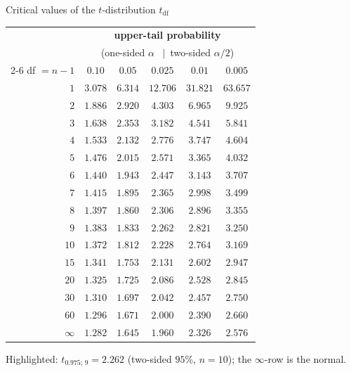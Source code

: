 \documentclass[aspectratio=169,11pt]{beamer}
\begin{document}
\begin{frame}{Critical values of the $t$-distribution $t_{\mathrm{df}}$}
  \begin{center}
    \scriptsize
    \renewcommand{\arraystretch}{0.95}
    \begin{tabular}{r|ccccc}
      \toprule
      & \multicolumn{5}{c}{\textbf{upper-tail probability}}\\
      & \multicolumn{5}{c}{(one-sided $\alpha$ \ $\mid$\ two-sided $\alpha/2$)}\\
      \cmidrule(l){2-6}
      df $=n-1$ & $0.10$ & $0.05$ & $0.025$ & $0.01$ & $0.005$\\
      \midrule
      $1$   & $3.078$ & $6.314$ & $12.706$ & $31.821$ & $63.657$\\
      $2$   & $1.886$ & $2.920$ & $4.303$  & $6.965$  & $9.925$\\
      $3$   & $1.638$ & $2.353$ & $3.182$  & $4.541$  & $5.841$\\
      $4$   & $1.533$ & $2.132$ & $2.776$  & $3.747$  & $4.604$\\
      $5$   & $1.476$ & $2.015$ & $2.571$  & $3.365$  & $4.032$\\
      $6$   & $1.440$ & $1.943$ & $2.447$  & $3.143$  & $3.707$\\
      $7$   & $1.415$ & $1.895$ & $2.365$  & $2.998$  & $3.499$\\
      $8$   & $1.397$ & $1.860$ & $2.306$  & $2.896$  & $3.355$\\
      $9$   & $1.383$ & $1.833$ & \cellcolor{hsbiorange!35}$2.262$ & $2.821$ & $3.250$\\
      $10$  & $1.372$ & $1.812$ & $2.228$  & $2.764$  & $3.169$\\
      $15$  & $1.341$ & $1.753$ & $2.131$  & $2.602$  & $2.947$\\
      $20$  & $1.325$ & $1.725$ & $2.086$  & $2.528$  & $2.845$\\
      $30$  & $1.310$ & $1.697$ & $2.042$  & $2.457$  & $2.750$\\
      $60$  & $1.296$ & $1.671$ & $2.000$  & $2.390$  & $2.660$\\
      $\infty$ & $1.282$ & $1.645$ & $1.960$ & $2.326$ & $2.576$\\
      \bottomrule
    \end{tabular}
  \end{center}
  \scriptsize Highlighted: $t_{0.975;\,9}=2.262$ (two-sided $95\%$, $n=10$); the $\infty$-row is the normal.
\end{frame}
\end{document}
